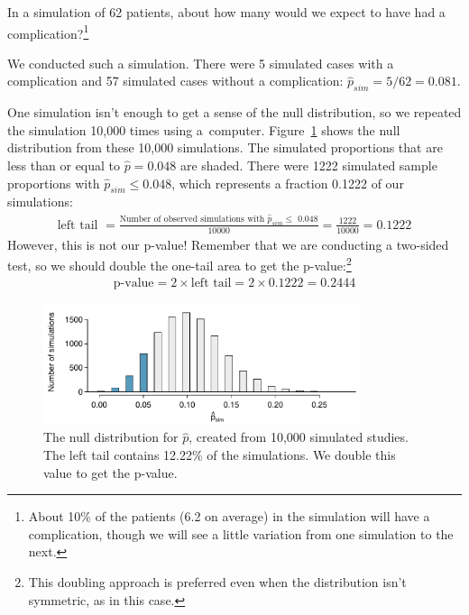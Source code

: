 \begin{exercise}
In a simulation of 62 patients, about how many would we expect to have had a complication?\footnote{About 10\% of the patients (6.2 on average) in the simulation will have a complication, though we will see a little variation from one simulation to the next.}
\end{exercise}

We conducted such a simulation. There were 5 simulated cases with a complication and 57 simulated cases without a complication: $\hat{p}_{sim} = 5/62 = 0.081$.

One simulation isn't enough to get a sense of the null distribution, so we repeated the simulation 10,000 times using a~computer. Figure~\ref{MedConsNullSim} shows the null distribution from these 10,000 simulations. The simulated proportions that are less than or equal to $\hat{p}=0.048$ are shaded. There were 1222 simulated sample proportions with $\hat{p}_{sim} \leq 0.048$, which represents a fraction 0.1222 of our simulations:
\begin{align*}
\text{left tail }
	= \frac{\text{Number of observed simulations with }\hat{p}_{sim}\leq\text{ 0.048}}{10000}
	= \frac{1222}{10000} = 0.1222
\end{align*}
However, this is not our p-value! Remember that we are conducting a two-sided test, so we should double the one-tail area to get the p-value:\footnote{This doubling approach is preferred even when the distribution isn't symmetric, as in this case.}
\begin{align*}
\text{p-value} = 2 \times \text{left tail} = 2 \times 0.1222 = 0.2444
\end{align*}

\begin{figure}[ht]
\centering
\includegraphics[width=0.83\textwidth]{05/figures/MedicalConsultant/MedConsNullSim}
\caption{The null distribution for $\hat{p}$, created from 10,000 simulated studies. The left tail contains 12.22\% of the simulations. We double this value to get the p-value.}
\label{MedConsNullSim}
\end{figure}

